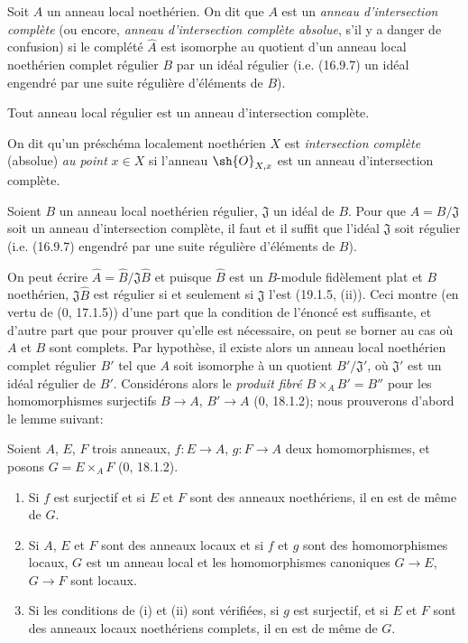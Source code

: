 
\begin{definition}[19.3.1]
Soit $A$ un anneau local noethérien. On dit que $A$ est un \emph{anneau d'intersection complète} (ou encore, \emph{anneau d'intersection complète absolue}, s'il y a danger de confusion) si le complété $\widehat A$ est isomorphe au quotient d'un anneau local noethérien complet régulier $B$ par un idéal régulier (i.e. (16.9.7) un idéal engendré par une suite régulière d'éléments de $B$).

Tout anneau local régulier est un anneau d'intersection complète.

On dit qu'un préschéma localement noethérien $X$ est \emph{intersection complète} (absolue) \emph{au point} $x\in X$ si l'anneau $\sh{O}_{X,x}$ est un anneau d'intersection complète.
\end{definition}

\begin{proposition}[19.3.2]
\label{IV.19.3.2}
Soient $B$ un anneau local noethérien régulier, $\mathfrak J$ un idéal de $B$. Pour que $A=B/\mathfrak J$ soit un anneau d'intersection complète, il faut et il suffit que l'idéal $\mathfrak J$ soit régulier (i.e. (16.9.7) engendré par une suite régulière d'éléments de $B$).
\end{proposition}

On peut écrire $\widehat A=\widehat B/\mathfrak J\widehat B$ et puisque $\widehat B$ est un $B$-module fidèlement plat et $B$ noethérien, $\mathfrak J\widehat B$ est régulier si et seulement si $\mathfrak J$ l'est (19.1.5, (ii)). Ceci montre (en vertu de ($0$, 17.1.5)) d'une part que la condition de l'énoncé est suffisante, et d'autre part que pour prouver qu'elle est nécessaire, on peut se borner au cas où $A$ et $B$ sont complets. Par hypothèse, il existe alors un anneau local noethérien complet régulier $B'$ tel que $A$ soit isomorphe à un quotient $B'/\mathfrak J'$, où $\mathfrak J'$ est un idéal régulier de $B'$. Considérons alors le \emph{produit fibré} $B\times_A B'=B''$ pour les homomorphismes surjectifs $B\to A$, $B'\to A$ ($0$, 18.1.2); nous prouverons d'abord le lemme suivant:

\begin{lemma}[19.3.2.1]
\label{IV.19.3.2.1}
Soient $A$, $E$, $F$ trois anneaux, $f:E\to A$, $g:F\to A$ deux homomorphismes, et posons $G=E\times_A F$ ($0$, 18.1.2).
\begin{enumerate}
  \item[(i)] Si $f$ est surjectif et si $E$ et $F$ sont des anneaux noethériens, il en est de même de $G$.
  \item[(ii)] Si $A$, $E$ et $F$ sont des anneaux locaux et si $f$ et $g$ sont des homomorphismes locaux, $G$ est un anneau local et les homomorphismes canoniques $G\to E$, $G\to F$ sont locaux.
  \item[(iii)] Si les conditions de (i) et (ii) sont vérifiées, si $g$ est surjectif, et si $E$ et $F$ sont des anneaux locaux noethériens complets, il en est de même de $G$.
\end{enumerate}
\end{lemma}

